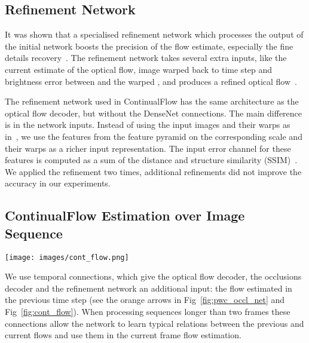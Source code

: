 \documentclass[runningheads]{llncs}
\begin{document}
\subsection{Refinement Network}
It was shown that a specialised refinement network which processes the output of the initial network boosts the precision of the flow estimate, especially the fine details recovery~\cite{Ilg2016,Pang2017}.
The refinement network takes several extra inputs, like the current estimate of the optical flow, image  warped back to time step  and brightness error between  and the warped , and produces a refined optical flow~\cite{Ilg2016}.

The refinement network used in ContinualFlow has the same architecture as the optical flow decoder, but without the DenseNet connections.
The main difference is in the network inputs.
Instead of using the input images and their warps as in~\cite{Ilg2016}, we use the features from the feature pyramid on the corresponding scale and their warps as a richer input representation.
The input error channel for these features is computed as a sum of the  distance and structure similarity (SSIM)~\cite{Wang2004}.
We applied the refinement two times, additional refinements did not improve the accuracy in our experiments.

\subsection{ContinualFlow Estimation over Image Sequence}
\label{sec:cont_flow}
\begin{figure*}[t]
\centering
\texttt{[image: images/cont\_flow.png]}
\caption{Block diagram of ContinualFlow. Feature extractors with shared weights compute a feature pyramid from the input images. Features are input to the optical flow and occlusion decoder and the refinement blocks. The decoder estimates the optical flow and the occlusion map from the input features and from the temporal connection -- the warped optical flow from the previous time step. Optical flow and occlusion maps are finalised by the refinement blocks.}
\label{fig:cont_flow}
\end{figure*}

We use temporal connections, which give the optical flow decoder, the occlusions decoder and the refinement network an additional input: the flow estimated in the previous time step (see the orange arrows in Fig~\ref{fig:pwc_occl_net} and Fig~\ref{fig:cont_flow}).
When processing sequences longer than two frames these connections allow the network to learn typical relations between the previous and current  flows and use them in the current frame flow estimation.
\end{document}

